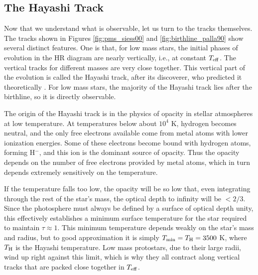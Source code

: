 \subsection{The Hayashi Track}

Now that we understand what is observable, let us turn to the tracks themselves. The tracks shown in Figures \ref{fig:pms_siess00} and \ref{fig:birthline_palla90} show several distinct features. One is that, for low mass stars, the initial phases of evolution in the HR diagram are nearly vertically, i.e., at constant $T_{\rm eff}$. The vertical tracks for different masses are very close together. This vertical part of the evolution is called the Hayashi track, after its discoverer, who predicted it theoretically \citep{hayashi61a}. For low mass stars, the majority of the Hayashi track lies after the birthline, so it is directly observable.

The origin of the Hayashi track is in the physics of opacity in stellar atmospheres at low temperature. At temperatures below about $10^4$ K, hydrogen becomes neutral, and the only free electrons available come from metal atoms with lower ionization energies. Some of these electrons become bound with hydrogen atoms, forming H$^-$, and this ion is the dominant source of opacity.  Thus the opacity depends on the number of free electrons provided by metal atoms, which in turn depends extremely sensitively on the temperature.

If the temperature falls too low, the opacity will be so low that, even integrating through the rest of the star's mass, the optical depth to infinity will be $<2/3$. Since the photosphere must always be defined by a surface of optical depth unity, this effectively establishes a minimum surface temperature for the star required to maintain $\tau \approx 1$. This minimum temperature depends weakly on the star's mass and radius, but to good approximation it is simply $T_{\rm min} = T_{\rm H} = 3500$ K, where $T_{\rm H}$ is the Hayashi temperature. Low mass protostars, due to their large radii, wind up right against this limit, which is why they all contract along vertical tracks that are packed close together in $T_{\rm eff}$.

